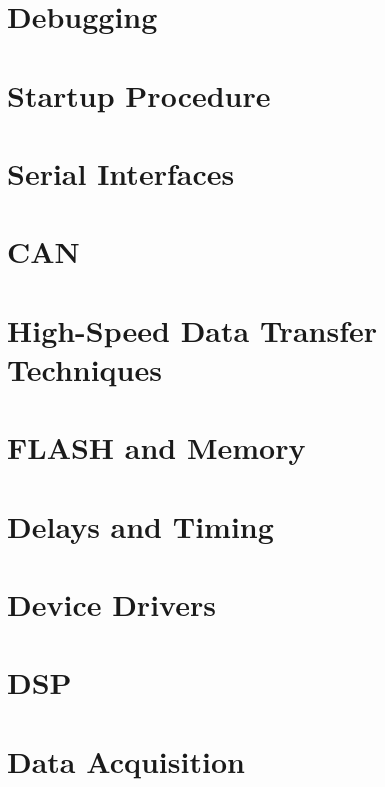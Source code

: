 \section{Debugging}


\section{Startup Procedure}


\section{Serial Interfaces}


\section{CAN}


\section{High-Speed Data Transfer Techniques}


\section{FLASH and Memory}


\section{Delays and Timing}


\section{Device Drivers}


\section{DSP}


\section{Data Acquisition}

